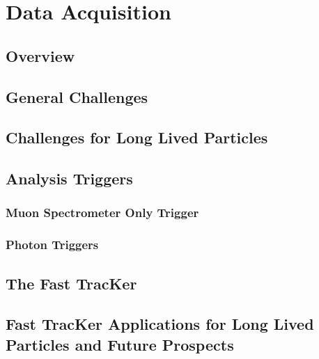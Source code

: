 \chapter{Data Acquisition}

\section{Overview}
\section{General Challenges}
\section{Challenges for Long Lived Particles}
\section{Analysis Triggers}
\subsection{Muon Spectrometer Only Trigger}
\subsection{Photon Triggers}
\section{The Fast TracKer}
\section{Fast TracKer Applications for Long Lived Particles and Future Prospects}
